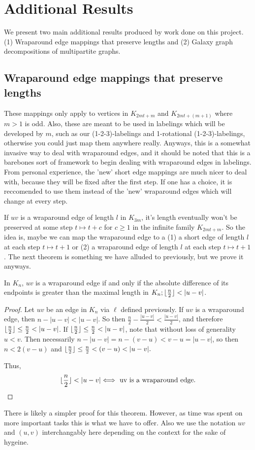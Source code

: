 \chapter{Additional Results} \label{chap:Additional Results}

We present two main additional results produced by work done on this project. (1) Wraparound edge mappings that preserve lengths and (2) Galaxy graph decompositions of multipartite graphs.

\section{Wraparound edge mappings that preserve lengths}

These mappings only apply to vertices in $K_{2mt+m}$ and $K_{2mt+(m+1)}$ where $m>1$ is odd. Also, these are meant to be used in labelings which will be developed by $m$, such as our (1-2-3)-labelings and 1-rotational (1-2-3)-labelings, otherwise you could just map them anywhere really. Anyways, this is a somewhat invasive way to deal with wraparound edges, and it should be noted that this is a barebones sort of framework to begin dealing with wraparound edges in labelings. From personal experience, the 'new' short edge mappings are much nicer to deal with, because they will be fixed after the first step. If one has a choice, it is reccomended to use them instead of the 'new' wraparound edges which will change at every step.

If $uv$ is a wraparound edge of length $l$ in $K_{3m}$, it's length eventually won't be preserved at some step $t\mapsto t+c$ for $c\geq 1$ in the infinite family $K_{2mt+m}$. So the idea is, maybe we can map the wraparound edge to a (1) a short edge of length $l$ at each step $t\mapsto t+1$ or (2) a wraparound edge of length $l$ at each step $t\mapsto t+1$. The next theorem is something we have alluded to previously, but we prove it anyways.\newpage
\begin{thm} \label{thm:wraplarger}
    In $K_{n}$, $uv$ is a wraparound edge if and only if the absolute difference of its endpoints is greater than the maximal length in $K_{n};\floor{\frac{n}{2}}<|u-v|$. 
    \begin{proof}
        Let $uv$ be an edge in $K_{n}$ via $\ell$ defined previously. If $uv$ is a wraparound edge, then $n-|u-v|<|u-v|$. So then $\frac{n}{2}-\frac{|u-v|}{2}<\frac{|u-v|}{2}$, and therefore $\floor{\frac{n}{2}}\leq \frac{n}{2}<|u-v|$. If $\floor{\frac{n}{2}}\leq \frac{n}{2}<|u-v|$, note that without loss of generality $u<v$. Then necessarily $n-|u-v|=n-(v-u)<v-u=|u-v|$, so then $n<2(v-u)$ and $\floor{\frac{n}{2}}\leq\frac{n}{2}<(v-u)<|u-v|.$
    
        Thus,
        $$\floor{\frac{n}{2}}<|u-v|\Longleftrightarrow\text{ uv is a wraparound edge.}$$
    \end{proof}
    \end{thm}
There is likely a simpler proof for this theorem. However, as time was spent on more important tasks this is what we have to offer. Also we use the notation $uv$ and $(u,v)$ interchangably here depending on the context for the sake of hygeine.

